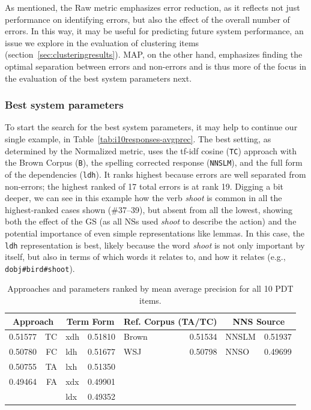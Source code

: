 \documentclass[11pt,letterpaper]{article}
\newcommand{\param}[1]{\texttt{#1}}
\begin{document}
As mentioned, the Raw metric emphasizes error reduction, as it
reflects not just performance on identifying errors, but also the
effect of the overall number of errors.  In this way, it may be useful
for predicting future system performance, an issue we explore in the
evaluation of clustering items (section~\ref{sec:clusteringresults}).
MAP, on the other hand, emphasizes finding the optimal separation
between errors and non-errors and is thus more of the focus in the
evaluation of the best system parameters next.

\subsubsection{Best system parameters} 

To start the search for the best system parameters, it may help to
continue our single example, in
Table~\ref{tab:i10responses-avgprec}. The best setting, as determined by the
Normalized metric, uses the tf-idf cosine (\param{TC}) approach with the Brown Corpus (\param{B}),
the spelling corrected response (\param{NNSLM}), and the full form of
the dependencies (\param{ldh}). It ranks highest because errors are
well separated from non-errors; the highest ranked of 17 total errors
is at rank 19.  Digging a bit deeper, we can see in this example how
the verb \textit{shoot} is common in all the highest-ranked cases shown
(\#37--39), but absent from all the lowest, showing both the effect of
the GS (as all NSs used \textit{shoot} to describe the action) and the
potential importance of even simple representations like lemmas.  In
this case, the \param{ldh} representation is best, likely because the
word \textit{shoot} is not only important by itself, but also in terms
of which words it relates to, and how it relates (e.g.,
\texttt{dobj\#bird\#shoot}).

\begin{table}
\begin{center}
\begin{tabular}{|l|r||l|r||l|r||l|r|}
 \hline
 \multicolumn{2}{|c||}{Approach} & \multicolumn{2}{|c||}{Term Form} & \multicolumn{2}{|c||}{Ref. Corpus (TA/TC)} & \multicolumn{2}{|c|}{NNS Source} \\
 \hline
 \hline
 0.51577 & TC & xdh & 0.51810 & Brown & 0.51534 & NNSLM & 0.51937 \\
 \hline
 0.50780 & FC & ldh & 0.51677 & WSJ & 0.50798 & NNSO & 0.49699 \\
 \hline
 0.50755 & TA & lxh & 0.51350 & & & & \\
 \hline
 0.49464 & FA & xdx & 0.49901 & & & & \\
 \hline
 & 	& ldx & 0.49352 &  &  &  & \\
 \hline
\end{tabular}
\caption{Approaches and parameters ranked by mean average precision for all 10 PDT items.}
\label{tab:dist-ranked-parameters}
\end{center}
\end{table}
\end{document}
